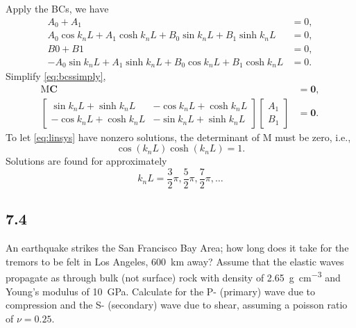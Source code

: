 \documentclass[12pt]{article}
\begin{document}
Apply the BCs, we have
\begin{equation}\label{eq:bcssimply}
  \begin{aligned}
    A_0 + A_1                                                            & = 0, \\
    A_0 \cos k_n L + A_1 \cosh k_n L + B_0 \sin k_n L + B_1 \sinh k_n L  & =0,  \\
    B0 + B1                                                              & = 0, \\
    -A_0 \sin k_n L + A_1 \sinh k_n L + B_0 \cos k_n L + B_1 \cosh k_n L & =0.
  \end{aligned}
\end{equation}
Simplify \eqref{eq:bcssimply},
\begin{align}
  \mathrm{ M } \bm{C}       & = \bm{0}, \label{eq:linsys} \\
  \begin{bmatrix}
    \sin k_n L + \sinh k_n L  & -\cos k_n L + \cosh k_n L \\
    -\cos k_n L + \cosh k_n L & -\sin k_n L + \sinh k_n L
  \end{bmatrix}
  \begin{bmatrix}
    A_1 \\
    B_1
  \end{bmatrix} & = \bm{0}.
\end{align}
To let \eqref{eq:linsys} have nonzero solutions,
the determinant of $\mathrm{ M }$ must be zero, i.e.,
\begin{equation}
  \cos ( k_n L ) \cosh ( k_n L ) = 1.
\end{equation}
Solutions are found for approximately
\begin{equation}
  k_n L = \frac{ 3 }{ 2 } \pi, \frac{ 5 }{ 2 } \pi, \frac{ 7 }{ 2 }\pi, \ldots
\end{equation}

\subsection{7.4}
An earthquake strikes the San Francisco Bay Area;
how long does it take for the tremors to be felt in Los Angeles, \SI{600}{\kilo\meter} away?
Assume that the elastic waves propagate as through bulk (not surface) rock with density
of \SI{2.65}{\gram \per \cubic \centi \meter} and Young's modulus of \SI{10}{\giga\pascal}.
Calculate for the P- (primary) wave due to compression and the
S- (secondary) wave due to shear, assuming a poisson ratio of $\nu= 0.25$.
\end{document}
